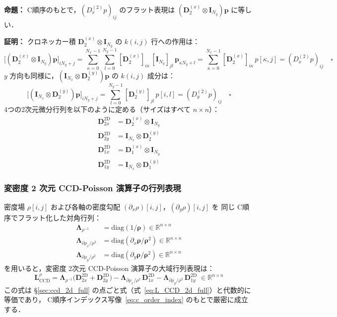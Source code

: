 \textbf{命題：} C順序のもとで，$(D_x^{(2)} p)_{ij}$ のフラット表現は $(\mathbf{D}_2^{(x)} \otimes \mathbf{I}_{N_y})\bm{p}$ に等しい．

\textbf{証明：}
クロネッカー積 $\mathbf{D}_2^{(x)} \otimes \mathbf{I}_{N_y}$ の $k(i,j)$ 行への作用は：
\[
  \bigl[(\mathbf{D}_2^{(x)} \otimes \mathbf{I}_{N_y})\bm{p}\bigr]_{i N_y + j}
  = \sum_{\kappa=0}^{N_x-1}\sum_{l=0}^{N_y-1}
    [\mathbf{D}_2^{(x)}]_{i\kappa}\,[\mathbf{I}_{N_y}]_{jl}\,\bm{p}_{\kappa N_y + l}
  = \sum_{\kappa=0}^{N_x-1} [\mathbf{D}_2^{(x)}]_{i\kappa}\,p[\kappa, j]
  = (D_x^{(2)} p)_{ij}
  \quad\square
\]
$y$ 方向も同様に，$(\mathbf{I}_{N_x} \otimes \mathbf{D}_2^{(y)})\bm{p}$ の $k(i,j)$ 成分は：
\[
  \bigl[(\mathbf{I}_{N_x} \otimes \mathbf{D}_2^{(y)})\bm{p}\bigr]_{i N_y + j}
  = \sum_{l=0}^{N_y-1} [\mathbf{D}_2^{(y)}]_{jl}\,p[i, l]
  = (D_y^{(2)} p)_{ij}
  \quad\square
\]
4つの2次元微分行列を以下のように定める（サイズはすべて $n \times n$）：
\begin{align}
  \mathbf{D}_{2x}^{\mathrm{2D}} &= \mathbf{D}_2^{(x)} \otimes \mathbf{I}_{N_y}
  \label{eq:D2x_2d} \\
  \mathbf{D}_{2y}^{\mathrm{2D}} &= \mathbf{I}_{N_x} \otimes \mathbf{D}_2^{(y)}
  \label{eq:D2y_2d} \\
  \mathbf{D}_{1x}^{\mathrm{2D}} &= \mathbf{D}_1^{(x)} \otimes \mathbf{I}_{N_y}
  \label{eq:D1x_2d} \\
  \mathbf{D}_{1y}^{\mathrm{2D}} &= \mathbf{I}_{N_x} \otimes \mathbf{D}_1^{(y)}
  \label{eq:D1y_2d}
\end{align}

\subsubsection{変密度 2 次元 CCD-Poisson 演算子の行列表現}

密度場 $\rho[i,j]$ および各軸の密度勾配 $(\partial_x\rho)[i,j]$，$(\partial_y\rho)[i,j]$ を
同じ C順序でフラット化した対角行列：
\begin{align}
  \boldsymbol{\Lambda}_{\rho^{-1}}       &= \mathrm{diag}(1/\bm{\rho})
  \in \mathbb{R}^{n \times n} \\
  \boldsymbol{\Lambda}_{\partial\rho_x/\rho^2} &= \mathrm{diag}(\partial_x\bm{\rho}/\bm{\rho}^2)
  \in \mathbb{R}^{n \times n} \\
  \boldsymbol{\Lambda}_{\partial\rho_y/\rho^2} &= \mathrm{diag}(\partial_y\bm{\rho}/\bm{\rho}^2)
  \in \mathbb{R}^{n \times n}
\end{align}
を用いると，変密度 2次元 CCD-Poisson 演算子の大域行列表現は：
\begin{equation}
  \boxed{
  \mathbf{L}_{\mathrm{CCD}}^{\rho}
  = \boldsymbol{\Lambda}_{\rho^{-1}}\!
    \bigl(\mathbf{D}_{2x}^{\mathrm{2D}} + \mathbf{D}_{2y}^{\mathrm{2D}}\bigr)
  - \boldsymbol{\Lambda}_{\partial\rho_x/\rho^2}\,\mathbf{D}_{1x}^{\mathrm{2D}}
  - \boldsymbol{\Lambda}_{\partial\rho_y/\rho^2}\,\mathbf{D}_{1y}^{\mathrm{2D}}
  \;\in \mathbb{R}^{n \times n}
  }
  \label{eq:L_CCD_2d_kron}
\end{equation}
この式は §\ref{sec:ccd_2d_full} の点ごと式（式~\eqref{eq:L_CCD_2d_full}）と代数的に等価であり，
C順序インデックス写像~\eqref{eq:c_order_index} のもとで厳密に成立する．

